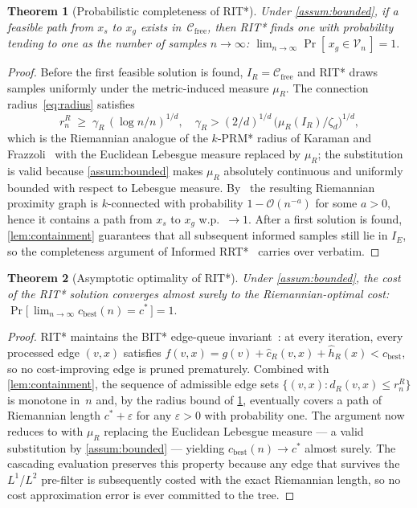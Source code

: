 \documentclass[journal]{IEEEtran}
\newtheorem{theorem}{Theorem}
\newcommand{\Cfree}{\mathcal{C}_{\mathrm{free}}}
\newcommand{\IR}{I_{\!R}}
\newcommand{\IE}{I_{\!E}}
\newcommand{\dR}{d_{\!R}}
\newcommand{\muR}{\mu_{\!R}}
\begin{document}
\begin{theorem}[Probabilistic completeness of RIT*]\label{thm:pc}
Under \cref{assum:bounded}, if a feasible path from $x_s$ to $x_g$
exists in~$\Cfree$, then RIT* finds one with probability tending to
one as the number of samples $n \to \infty$:
$\lim_{n\to\infty} \Pr[\,x_g \in \mathcal V_n\,] = 1.$
\end{theorem}
\begin{proof}
Before the first feasible solution is found, $\IR = \Cfree$ and
RIT* draws samples uniformly under the metric-induced measure
$\muR$.  The connection radius~\eqref{eq:radius} satisfies
\begin{equation*}
  r_n^R \;\ge\; \gamma_R\,(\log n/n)^{1/d},
  \quad
  \gamma_R > (2/d)^{1/d}\,\bigl(\muR(\IR)/\zeta_d\bigr)^{1/d},
\end{equation*}
which is the Riemannian analogue of the $k$-PRM* radius of
Karaman and Frazzoli~\cite{Karaman2011} with the Euclidean
Lebesgue measure replaced by $\muR$; the substitution is valid
because \cref{assum:bounded} makes $\muR$ absolutely continuous
and uniformly bounded with respect to Lebesgue measure.
By~\cite[Thm.~38]{Karaman2011} the resulting Riemannian
proximity graph is $k$-connected with probability
$1 - \mathcal{O}(n^{-a})$ for some $a > 0$, hence it contains a
path from $x_s$ to $x_g$ w.p.\ $\to 1$.  After a first solution is
found, \cref{lem:containment} guarantees that all subsequent
informed samples still lie in $\IE$, so the completeness argument
of Informed RRT*~\cite[Thm.~1]{Gammell2018} carries over verbatim.
\end{proof}

\begin{theorem}[Asymptotic optimality of RIT*]\label{thm:ao}
Under \cref{assum:bounded}, the cost of the RIT* solution converges
almost surely to the Riemannian-optimal cost:
$\Pr\bigl[\,\lim_{n\to\infty} c_{\mathrm{best}}(n) = c^*\,\bigr] = 1.$
\end{theorem}
\begin{proof}
RIT* maintains the BIT* edge-queue invariant~\cite{Gammell2020}:
at every iteration, every processed edge $(v, x)$ satisfies
$f(v, x) = g(v) + \hat c_R(v, x) + \hat h_R(x) < c_{\mathrm{best}}$,
so no cost-improving edge is pruned prematurely.  Combined with
\cref{lem:containment}, the sequence of admissible edge sets
$\{(v,x) : \dR(v, x) \le r_n^R\}$ is monotone in~$n$ and, by the
radius bound of \cref{thm:pc}, eventually covers a path of
Riemannian length $c^* + \varepsilon$ for any $\varepsilon > 0$
with probability one.  The argument now reduces to
\cite[Thm.~3]{Gammell2020} with $\muR$ replacing the Euclidean
Lebesgue measure — a valid substitution by
\cref{assum:bounded} — yielding $c_{\mathrm{best}}(n) \!\to\! c^*$
almost surely.  The cascading evaluation preserves this property
because any edge that survives the $L^1$/$L^2$ pre-filter is
subsequently costed with the exact Riemannian length, so no cost
approximation error is ever committed to the tree.
\end{proof}
\end{document}
